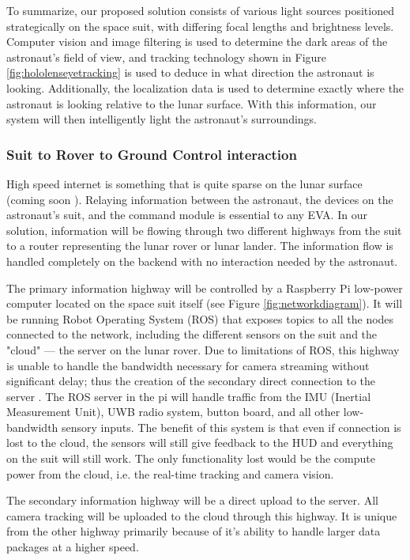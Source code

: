 \documentclass{article}
\let\Oldsubsubsection\subsubsection
\renewcommand{\subsubsection}{\FloatBarrier\Oldsubsubsection}
\begin{document}
To summarize, our proposed solution consists of various light sources positioned strategically on the space suit, with differing focal lengths and brightness levels. Computer vision and image filtering is used to determine the dark areas of the astronaut's field of view, and tracking technology shown in Figure \ref{fig:hololenseyetracking} is used to deduce in what direction the astronaut is looking. Additionally, the localization data is used to determine exactly where the astronaut is looking relative to the lunar surface. With this information, our system will then intelligently light the astronaut's surroundings.

\subsubsection{Suit to Rover to Ground Control interaction}

High speed internet is something that is quite sparse on the lunar surface (coming soon \autocite{mooninternet}). Relaying information between the astronaut, the devices on the astronaut's suit, and the command module is essential to any EVA. In our solution, information will be flowing through two different highways from the suit to a router representing the lunar rover or lunar lander. The information flow is handled completely on the backend with no interaction needed by the astronaut.

The primary information highway will be controlled by a Raspberry Pi low-power computer located on the space suit itself (see Figure \ref{fig:networkdiagram}). It will be running Robot Operating System (ROS) that exposes topics to all the nodes connected to the network, including the different sensors on the suit and the "cloud" --- the server on the lunar rover. Due to limitations of ROS, this highway is unable to handle the bandwidth necessary for camera streaming without significant delay; thus the creation of the secondary direct connection to the server \autocite{dataperformance}. The ROS server in the pi will handle traffic from the IMU (Inertial Measurement Unit), UWB radio system, button board, and all other low-bandwidth sensory inputs. The benefit of this system is that even if connection is lost to the cloud, the sensors will still give feedback to the HUD and everything on the suit will still work. The only functionality lost would be the compute power from the cloud, i.e. the real-time tracking and camera vision.

The secondary information highway will be a direct upload to the server. All camera tracking will be uploaded to the cloud through this highway. It is unique from the other highway primarily because of it's ability to handle larger data packages at a higher speed.
\end{document}
